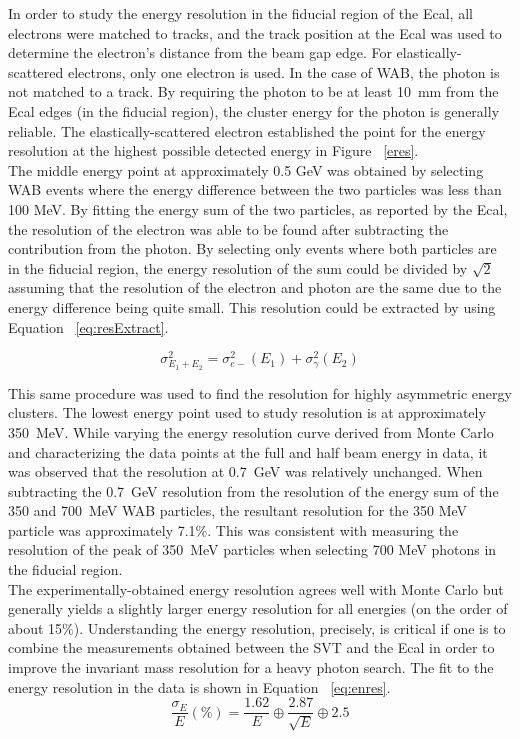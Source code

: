 \documentclass[twoside]{article}
\begin{document}
\begin{multicols}{2}
In order to study the energy resolution in the fiducial region of the Ecal, all electrons were matched to tracks, and the track position at the Ecal was used to determine the electron's distance from the beam gap edge. For elastically-scattered electrons, only one electron is used. In the case of WAB, the photon is not matched to a track. By requiring the photon to be at least 10~mm from the Ecal edges (in the fiducial region), the cluster energy for the photon is generally reliable. The elastically-scattered electron established the point for the energy resolution at the highest possible detected energy in Figure ~\ref{eres}.\\
\indent The middle energy point at approximately 0.5 GeV was obtained by selecting WAB events where the energy difference between the two particles was less than 100 MeV. By fitting the energy sum of the two particles, as reported by the Ecal, the resolution of the electron was able to be found  after subtracting the contribution from the photon. By selecting only events where both particles are in the fiducial region, the energy resolution of the sum could be divided by $\sqrt{2}$ assuming that the resolution of the electron and photon are the same due to the energy difference being quite small. This resolution could be extracted by using Equation ~\eqref{eq:resExtract}.


\begin{equation}
\label{eq:resExtract}
\sigma_{E_{1}+E_{2}}^{2} = \sigma_{e-}^2(E_1)+\sigma_{\gamma}^2(E_2)
\end{equation}

This same procedure was used to find the resolution for highly asymmetric energy clusters. The lowest energy point used to study resolution is at approximately 350~MeV. While varying the energy resolution curve derived from Monte Carlo and characterizing the data points at the full and half beam energy in data, it was observed that the resolution at 0.7~GeV was relatively unchanged. When subtracting the 0.7~GeV resolution from the resolution of the energy sum of the 350 and 700~MeV WAB particles, the resultant resolution for the 350 MeV particle was approximately 7.1$\%$. This was consistent with measuring the resolution of the peak of 350~MeV particles when selecting 700 MeV photons in the fiducial region.\\
\indent The experimentally-obtained energy resolution agrees well with Monte Carlo but generally yields a slightly larger energy resolution for all energies (on the order of about 15$\%$). Understanding the energy resolution, precisely, is critical if one is to combine the measurements obtained between the SVT and the Ecal in order to improve the invariant mass resolution for a heavy photon search. The fit to the energy resolution in the data is shown in Equation ~\ref{eq:enres}.
\begin{equation}
\label{eq:enres}
\dfrac{\sigma_E}{E}(\%)=\dfrac{1.62}{E}\oplus \dfrac{2.87}{\sqrt{E}} \oplus 2.5
\end{equation}
 

\end{multicols}
\end{document}
